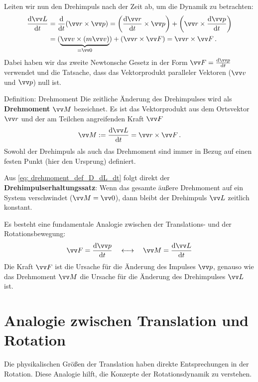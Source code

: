 Leiten wir nun den Drehimpuls nach der Zeit ab, um die Dynamik zu betrachten:
\begin{align}
\frac{\dd\ivec{L}}{\dd t} &= \frac{\dd}{\dd t} (\ivec{r} \times \ivec{p}) = \left(\frac{\dd\ivec{r}}{\dd t} \times \ivec{p}\right) + \left(\ivec{r} \times \frac{\dd\ivec{p}}{\dd t}\right) \\
&= (\underbrace{\ivec{v} \times (m\ivec{v})}_{=\ivec{0}}) + \left(\ivec{r} \times \ivec{F}\right) = \ivec{r} \times \ivec{F} \mDot
\end{align}
Dabei haben wir das zweite Newtonsche Gesetz in der Form $\ivec{F} = \frac{\dd\ivec{p}}{\dd t}$ verwendet und die Tatsache, dass das Vektorprodukt paralleler Vektoren ($\ivec{v}$ und $\ivec{p}$) null ist.

\begin{importantbox}{Definition: Drehmoment}
Die zeitliche Änderung des Drehimpulses wird als \textbf{Drehmoment} $\ivec{M}$ bezeichnet. Es ist das Vektorprodukt aus dem Ortsvektor $\ivec{r}$ und der am Teilchen angreifenden Kraft $\ivec{F}$
\begin{equation}\label{eq: drehmoment_def_D_dL_dt}
\ivec{M} := \frac{\dd\ivec{L}}{\dd t} = \ivec{r} \times \ivec{F} \mDot
\end{equation}
Sowohl der Drehimpuls als auch das Drehmoment sind immer in Bezug auf einen festen Punkt (hier den Ursprung) definiert.
\end{importantbox}

Aus \cref{eq: drehmoment_def_D_dL_dt} folgt direkt der \textbf{Drehimpulserhaltungssatz}: Wenn das gesamte äußere Drehmoment auf ein System verschwindet ($\ivec{M} = \ivec{0}$), dann bleibt der Drehimpuls $\ivec{L}$ zeitlich konstant.

Es besteht eine fundamentale Analogie zwischen der Translations- und der Rotationsbewegung:
$$ \ivec{F} = \frac{\dd\ivec{p}}{\dd t} \quad \longleftrightarrow \quad \ivec{M} = \frac{\dd\ivec{L}}{\dd t} $$
Die Kraft $\ivec{F}$ ist die Ursache für die Änderung des Impulses $\ivec{p}$, genauso wie das Drehmoment $\ivec{M}$ die Ursache für die Änderung des Drehimpulses $\ivec{L}$ ist.

\section{Analogie zwischen Translation und Rotation}\label{sec: analogie_translation_rotation}

Die physikalischen Größen der Translation haben direkte Entsprechungen in der Rotation. Diese Analogie hilft, die Konzepte der Rotationsdynamik zu verstehen.

